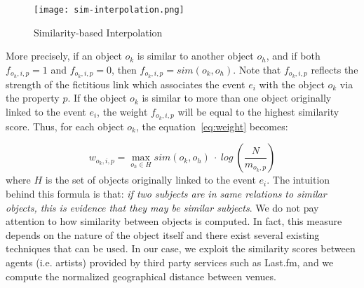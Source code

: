 \begin{figure}[htb]
  \centering
  \texttt{[image: sim-interpolation.png]}
  \caption{Similarity-based Interpolation}
  \label{fig:interpolation}
\end{figure}

More precisely, if an object $o_{k}$ is similar to another object $o_{h}$, and if both $f_{o_{h},i,p} = 1$ and $f_{o_{k},i,p} = 0$, then $f_{o_{k},i,p} = sim(o_{k},o_{h})$. Note that $f_{o_{k},i,p}$ reflects the strength of the fictitious link which associates the event $e_{i}$ with the object $o_{k}$ via the property $p$. If the object $o_{k}$ is similar to more than one object originally linked to the event $e_{i}$, the weight $f_{o_{k},i,p}$ will be equal to the highest similarity score. Thus, for each object $o_{k}$, the equation~\ref{eq:weight} becomes:

\begin{equation}
w_{o_{k},i,p}= \max_{o_{h} \in H}sim(o_{k},o_{h}) \ \cdot \ log \ \left(\frac {N}{m_{o_{k},p}}\right)
\end{equation}
where $H$ is the set of objects originally linked to the event $e_{i}$. The intuition behind this formula is that: \textit{if two subjects are in same relations to similar objects, this is evidence that they may be similar subjects}. We do not pay attention to how similarity between objects is computed. In fact, this measure depends on the nature of the object itself and there exist several existing techniques that can be used. In our case, we exploit the similarity scores between agents (i.e. artists) provided by third party services such as Last.fm, and we compute the normalized geographical distance between venues.



